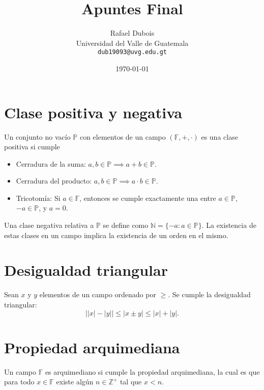 \documentclass{article}
\title{Apuntes Final}
\author{\Large Rafael Dubois\\ Universidad del Valle de Guatemala \\ \texttt{dub19093@uvg.edu.gt}}
\date{\today}
\begin{document}
\maketitle
{}
\thispagestyle{fancy}

\section*{Clase positiva y negativa}

Un conjunto no vacío $\mathbb{P}$ con elementos de un campo $(\mathbb{F},+,\cdot)$ es una clase positiva si cumple
\begin{itemize}
\item Cerradura de la suma: $a,b\in\mathbb{P}\implies a+b\in\mathbb{P}$.

\item Cerradura del producto: $a,b\in\mathbb{P}\implies a\cdot b\in\mathbb{P}$.

\item Tricotomía: Si $a\in\mathbb{F}$, entonces se cumple exactamente una entre $a\in\mathbb{P}$, $-a\in\mathbb{P}$, y $a=0$.
\end{itemize}
Una clase negativa relativa a $\mathbb{P}$ se define como $\mathbb{N}=\{-a:a\in\mathbb{P}\}$. La existencia de estas clases en un campo implica la existencia de un orden en el mismo.

\section*{Desigualdad triangular}

Sean $x$ y $y$ elementos de un campo ordenado por $\geq$. Se cumple la desigualdad triangular:
$$\big||x|-|y|\big|\leq |x\pm y|\leq |x|+|y|.$$

\section*{Propiedad arquimediana}

Un campo $\mathbb{F}$ es arquimediano si cumple la propiedad arquimediana, la cual es que para todo $x\in\mathbb{F}$ existe algún $n\in\mathbb{Z}^{+}$ tal que $x<n$.
\end{document}
